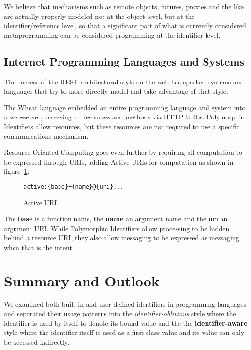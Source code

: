 \documentclass[preprint,authoryear]{acm_proc_article-sp}
\begin{document}
We believe that mechanisms such as remote objects, futures, proxies and the like
are actually properly modeled not at the object level, but at the identifier/reference
level, so that a significant part of what is currently considered metaprogramming
can be considered programming at the identifier level.

\subsection{Internet Programming Languages and Systems}

The success of the REST architectural style\cite{fielding-rest} on the web has sparked
systems and languages that try to more directly model and take advantage of that
style.

The Wheat language \cite{wheat} embedded an entire programming language
and system into a web-server, accessing all resources and methods via
HTTP URLs.  Polymorphic Identifiers allow resources, but these resources
are not required to use a specific communications mechanism.


Resource Oriented Computing \cite{roc} goes even further by
requiring all computation to be expressed through URIs, adding Active URIs
for computation as shown in figure~\ref{activeuri}.   


\begin{figure}[htbp]
\begin{center}
\begin{small}
\begin{verbatim}
active:{base}+{name}@{uri}...
\end{verbatim}
\end{small}
\caption{Active URI}
\label{activeuri}
\end{center}
\end{figure}

The {\bf base} is a function name, the {\bf name} an argument name and the
{\bf uri} an argument URI.
 While Polymorphic Identifiers allow processing to be
hidden behind a resource URI, they also allow messaging to be expressed
as messaging when that is the intent.



\section{Summary and Outlook}

We examined both built-in and user-defined identifiers in programming languages 
and separated their usage patterns into the {\em identifier-oblivious} style where
the identifier is used by itself to denote its bound value and the 
the {\bf identifier-aware} style where the identifier itself is used as a first class value
and its value can only be accessed indirectly.
\end{document}
